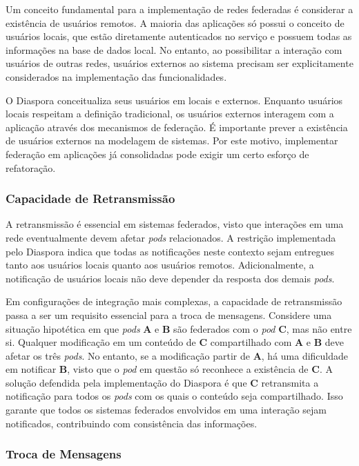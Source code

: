 Um conceito fundamental para a implementação de redes federadas é considerar a
existência de usuários remotos. A maioria das aplicações só possui o conceito de
usuários locais, que estão diretamente autenticados no serviço e possuem todas as
informações na base de dados local. No entanto, ao possibilitar a interação com
usuários de outras redes, usuários externos ao sistema precisam ser explicitamente
considerados na implementação das funcionalidades.

O Diaspora conceitualiza seus usuários em locais e externos. Enquanto usuários locais
respeitam a definição tradicional, os usuários externos interagem com a aplicação
através dos mecanismos de federação. É importante prever a existência de usuários
externos na modelagem de sistemas. Por este motivo, implementar federação em
aplicações já consolidadas pode exigir um certo esforço de refatoração. %

\subsubsection{Capacidade de Retransmissão}

A retransmissão é essencial em sistemas federados, visto que interações em uma rede
eventualmente devem afetar \textit{pods} relacionados. A restrição implementada pelo
Diaspora indica que todas as notificações neste contexto sejam entregues tanto aos
usuários locais quanto aos usuários remotos. Adicionalmente, a notificação de
usuários locais não deve depender da resposta dos demais \textit{pods}.

Em configurações de integração mais complexas, a capacidade de retransmissão passa a
ser um requisito essencial para a troca de mensagens. Considere uma situação
hipotética em que \textit{pods} \textbf{A} e \textbf{B} são federados com o
\textit{pod} \textbf{C}, mas não entre si. Qualquer modificação em um conteúdo de
\textbf{C} compartilhado com \textbf{A} e \textbf{B} deve afetar os três
\textit{pods}. No entanto, se a modificação partir de \textbf{A}, há uma dificuldade
em notificar \textbf{B}, visto que o \textit{pod} em questão só reconhece a
existência de \textbf{C}. A solução defendida pela implementação do Diaspora é que
\textbf{C} retransmita a notificação para todos os \textit{pods} com os quais o
conteúdo seja compartilhado. Isso garante que todos os sistemas federados envolvidos
em uma interação sejam notificados, contribuindo com consistência das informações.

\subsubsection{Troca de Mensagens}

